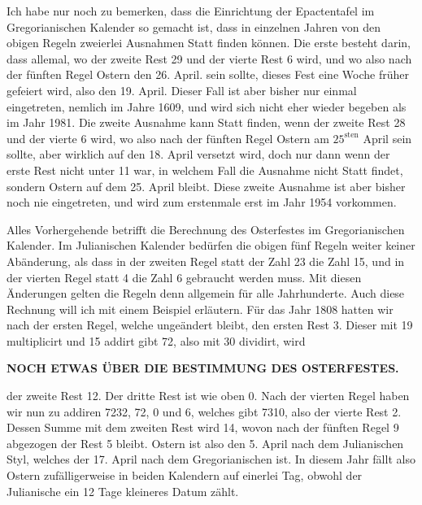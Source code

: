 Ich habe nur noch zu bemerken, dass die Einrichtung der Epactentafel im
Gregorianischen Kalender so gemacht ist, dass in einzelnen Jahren von den obigen
Regeln zweierlei Ausnahmen Statt finden können. Die erste besteht darin,
dass allemal, wo der zweite Rest 29 und der vierte Rest 6 wird, und wo also
nach der fünften Regel Ostern den 26. April. sein sollte, dieses Fest eine Woche
früher gefeiert wird, also den 19. April. Dieser Fall ist aber bisher nur einmal
eingetreten, nemlich im Jahre 1609, und wird sich nicht eher wieder begeben
als im Jahr 1981. Die zweite Ausnahme kann Statt finden, wenn der zweite
Rest 28 und der vierte 6 wird, wo also nach der fünften Regel Ostern am $25^{\mathrm{sten}}$
April sein sollte, aber wirklich auf den 18. April versetzt wird, doch nur dann
wenn der erste Rest nicht unter 11 war, in welchem Fall die Ausnahme nicht
Statt findet, sondern Ostern auf dem 25. April bleibt. Diese zweite Ausnahme
ist aber bisher noch nie eingetreten, und wird zum erstenmale erst im Jahr 1954
vorkommen.

Alles Vorhergehende betrifft die Berechnung des Osterfestes im Gregorianischen
Kalender. Im Julianischen Kalender bedürfen die obigen fünf Regeln
weiter keiner Abänderung, als dass in der zweiten Regel statt der Zahl 23 die
Zahl 15, und in der vierten Regel statt 4 die Zahl 6 gebraucht werden muss.
Mit diesen Änderungen gelten die Regeln denn allgemein für alle Jahrhunderte.
Auch diese Rechnung will ich mit einem Beispiel erläutern. Für das Jahr 1808
hatten wir nach der ersten Regel, welche ungeändert bleibt, den ersten Rest 3.
Dieser mit 19 multiplicirt und 15 addirt gibt 72, also mit 30 dividirt, wird
\par
\clearpage
\thispagestyle{empty}
\noindent{}%
%
\parbox[t]{\dimexpr\linewidth-24mm\relax}{\centering\fontsize{8.2}{10}\selectfont\bfseries NOCH ETWAS ÜBER DIE BESTIMMUNG DES OSTERFESTES.\par}%
\makebox[12mm][r]{}\par\nobreak\medskip
\noindent der zweite Rest 12. Der dritte Rest ist wie oben 0. Nach der vierten Regel
haben wir nun zu addiren 7232, 72, 0 und 6, welches gibt 7310, also der vierte
Rest 2. Dessen Summe mit dem zweiten Rest wird 14, wovon nach der fünften
Regel 9 abgezogen der Rest 5 bleibt. Ostern ist also den 5. April nach dem
Julianischen Styl, welches der 17. April nach dem Gregorianischen ist. In diesem
Jahr fällt also Ostern zufälligerweise in beiden Kalendern auf einerlei Tag,
obwohl der Julianische ein 12 Tage kleineres Datum zählt.

